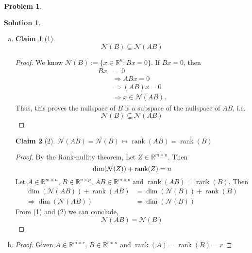 \documentclass{amsart}[11pt]
\newtheorem*{claim}{Claim}
\theoremstyle{definition}
\newtheorem{problem}{Problem}
\newtheorem{solution}{Solution}
\newcommand{\R}{\mathbb{R}}
\newcommand{\row}{\textnormal{Row}}
\newcommand{\rank}{\textnormal{rank}}
\begin{document}
\begin{problem}
\begin{solution}
\begin{enumerate}[(a)]
\begin{proof}
            \noindent $\therefore$ $\mathcal{N}(A)$ is orthogonal to $\row(A)$ 
        \end{proof}
        \vspace{\baselineskip}
        \item \begin{claim}[1]
            \[ \mathcal{N}(B) \subseteq \mathcal{N}(AB)\]
        \end{claim}
        \begin{proof}
            We know $\mathcal{N}(B):=\{x\in\R^n:Bx=0\}$. If $Bx=0$, then
            \begin{align*}
                Bx &= 0 \\
                &\Rightarrow ABx = 0 \\
                &\Rightarrow (AB)x = 0 \\
                &\Rightarrow x \in \mathcal{N}(AB).
            \end{align*}
            Thus, this proves the nullspace of $B$ is a subspace of the nullspace of $AB$, i.e.
            \[\mathcal{N}(B) \subseteq \mathcal{N}(AB)\tag{1}\]
        \end{proof}
        \begin{claim}[2]
            $\mathcal{N}(AB)=\mathcal{N}(B) \leftrightarrow \operatorname{rank}(AB)=\operatorname{rank}(B)$ 
        \end{claim}
        \begin{proof}
            By the Rank-nullity theorem, Let $Z\in\R^{m\times n}$.  Then
            \[ \dim(\mathcal{N}(Z))+\rank(Z) = n \]
            Let $A\in \R^{m \times n}$, $B\in\R^{n \times p}$, $AB\in\R^{m\times p}$ and $\operatorname{rank}(AB)=\operatorname{rank}(B)$. Then
            \begin{align*}
                \dim(\mathcal{N}(AB)) + \operatorname{rank}(AB) &= \dim(\mathcal{N}(B)) + \operatorname{rank}(B) \\
                \Rightarrow\dim(\mathcal{N}(AB))&=\dim(\mathcal{N}(B))
                \tag{2}
            \end{align*}
            From (1) and (2) we can conclude,
            \[\mathcal{N}(AB)=\mathcal{N}(B)\]
        \end{proof} 
        \vspace{\baselineskip}
        \item \begin{proof}
            Given $A\in\R^{m\times r}$, $B\in\R^{r\times n}$ and $\operatorname{rank}(A) = \operatorname{rank}(B)=r$


\end{proof}
\end{enumerate}
\end{solution}
\end{problem}
\end{document}
